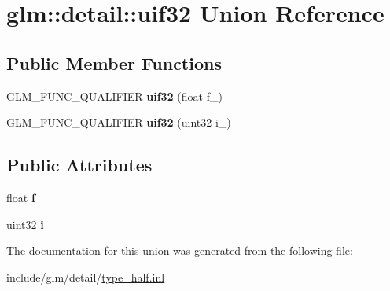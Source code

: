 \hypertarget{unionglm_1_1detail_1_1uif32}{}\section{glm\+:\+:detail\+:\+:uif32 Union Reference}
\label{unionglm_1_1detail_1_1uif32}
\subsection*{Public Member Functions}
\begin{DoxyCompactItemize}
\item 
\mbox{\label{unionglm_1_1detail_1_1uif32_a0d6e08c93b3d52c01e45864ff689c426}} 
G\+L\+M\+\_\+\+F\+U\+N\+C\+\_\+\+Q\+U\+A\+L\+I\+F\+I\+ER {\bfseries uif32} (float f\+\_\+)
\item 
\mbox{\label{unionglm_1_1detail_1_1uif32_aee424b46f48baa812572c015ec8bf434}} 
G\+L\+M\+\_\+\+F\+U\+N\+C\+\_\+\+Q\+U\+A\+L\+I\+F\+I\+ER {\bfseries uif32} (uint32 i\+\_\+)
\end{DoxyCompactItemize}
\subsection*{Public Attributes}
\begin{DoxyCompactItemize}
\item 
\mbox{\label{unionglm_1_1detail_1_1uif32_a5f697f84c5a8ec72c2f3a4f705f5bde8}} 
float {\bfseries f}
\item 
\mbox{\label{unionglm_1_1detail_1_1uif32_a981c1c59e160db23c73908cd7e629229}} 
uint32 {\bfseries i}
\end{DoxyCompactItemize}


The documentation for this union was generated from the following file\+:\begin{DoxyCompactItemize}
\item 
include/glm/detail/\hyperlink{type__half_8inl}{type\+\_\+half.\+inl}\end{DoxyCompactItemize}
